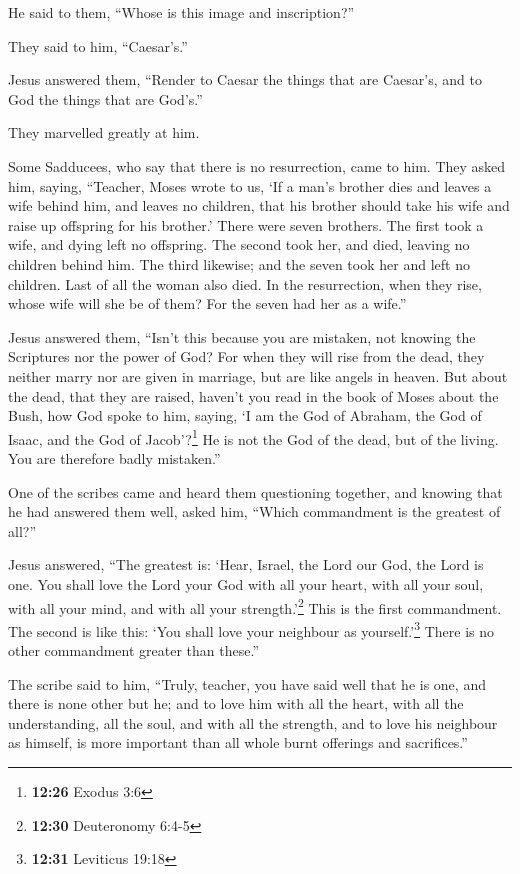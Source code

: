 He said to them, ``Whose is this image and inscription?''

They said to him, ``Caesar's.''

 Jesus answered them, ``Render to Caesar the things that
are Caesar's, and to God the things that are God's.''

They marvelled greatly at him.

 Some Sadducees, who say that there is no resurrection,
came to him. They asked him, saying,  ``Teacher, Moses
wrote to us, `If a man's brother dies and leaves a wife behind him, and
leaves no children, that his brother should take his wife and raise up
offspring for his brother.'  There were seven brothers.
The first took a wife, and dying left no offspring.  The
second took her, and died, leaving no children behind him. The third
likewise;  and the seven took her and left no children.
Last of all the woman also died.  In the resurrection,
when they rise, whose wife will she be of them? For the seven had her as
a wife.''

 Jesus answered them, ``Isn't this because you are
mistaken, not knowing the Scriptures nor the power of God?
 For when they will rise from the dead, they neither
marry nor are given in marriage, but are like angels in heaven.
 But about the dead, that they are raised, haven't you
read in the book of Moses about the Bush, how God spoke to him, saying,
`I am the God of Abraham, the God of Isaac, and the God of
Jacob'?\footnote{\textbf{12:26} Exodus 3:6}  He is not
the God of the dead, but of the living. You are therefore badly
mistaken.''

 One of the scribes came and heard them questioning
together, and knowing that he had answered them well, asked him, ``Which
commandment is the greatest of all?''

 Jesus answered, ``The greatest is: `Hear, Israel, the
Lord our God, the Lord is one.  You shall love the Lord
your God with all your heart, with all your soul, with all your mind,
and with all your strength.'\footnote{\textbf{12:30} Deuteronomy 6:4-5}
This is the first commandment.  The second is like this:
`You shall love your neighbour as yourself.'\footnote{\textbf{12:31}
  Leviticus 19:18} There is no other commandment greater than these.''

 The scribe said to him, ``Truly, teacher, you have said
well that he is one, and there is none other but he;  and
to love him with all the heart, with all the understanding, all the
soul, and with all the strength, and to love his neighbour as himself,
is more important than all whole burnt offerings and sacrifices.''

